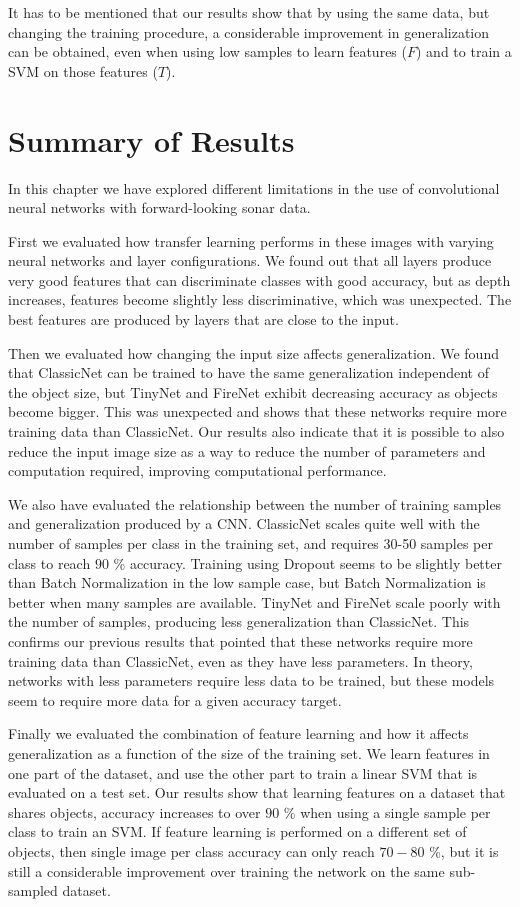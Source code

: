 It has to be mentioned that our results show that by using the same data, but changing the training procedure, a considerable improvement in generalization can be obtained, even when using low samples to learn features ($F$) and to train a SVM on those features ($T$).

\section{Summary of Results}

In this chapter we have explored different limitations in the use of convolutional neural networks with forward-looking sonar data.

First we evaluated how transfer learning performs in these images with varying neural networks and layer configurations. We found out that all layers produce very good features that can discriminate classes with good accuracy, but as depth increases, features become slightly less discriminative, which was unexpected. The best features are produced by layers that are close to the input.

Then we evaluated how changing the input size affects generalization. We found that ClassicNet can be trained to have the same generalization independent of the object size, but TinyNet and FireNet exhibit decreasing accuracy as objects become bigger. This was unexpected and shows that these networks require more training data than ClassicNet. Our results also indicate that it is possible to also reduce the input image size as a way to reduce the number of parameters and computation required, improving computational performance.

We also have evaluated the relationship between the number of training samples and generalization produced by a CNN. ClassicNet scales quite well with the number of samples per class in the training set, and requires 30-50 samples per class to reach $90$ \% accuracy. Training using Dropout seems to be slightly better than Batch Normalization in the low sample case, but Batch Normalization is better when many samples are available. TinyNet and FireNet scale poorly with the number of samples, producing less generalization than ClassicNet. This confirms our previous results that pointed that these networks require more training data than ClassicNet, even as they have less parameters. In theory, networks with less parameters require less data to be trained, but these models seem to require more data for a given accuracy target.

Finally we evaluated the combination of feature learning and how it affects generalization as a function of the size of the training set. We learn features in one part of the dataset, and use the other part to train a linear SVM that is evaluated on a test set. Our results show that learning features on a dataset that shares objects, accuracy increases to over $90$ \% when using a single sample per class to train an SVM. If feature learning is performed on a different set of objects, then single image per class accuracy can only reach $70-80$ \%, but it is  still a considerable improvement over training the network on the same sub-sampled dataset.

